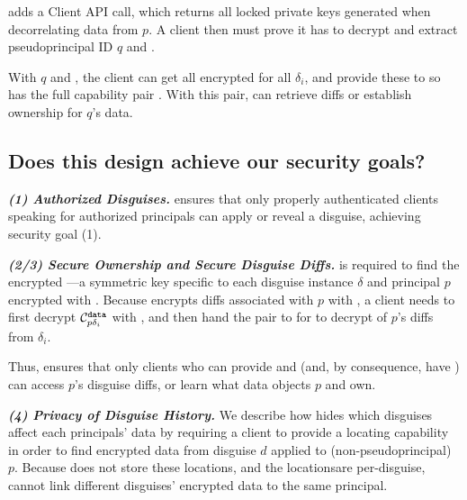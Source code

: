 \sys adds a  Client API call, which returns all locked private
keys  generated when decorrelating data from $p$.
A client then must prove it has  to decrypt  and extract pseudoprincipal ID $q$ and .

With $q$ and , the client can get all encrypted  for all $\delta_i$, and
provide these to \sys so \sys has the full capability pair . With
this pair, \sys can retrieve diffs or establish ownership for $q$'s data.


\subsection{Does this design achieve our security goals?}
\label{sec:achievegoals}
\vspace{6pt}\noindent\textbf{\emph{(1) Authorized Disguises.}}
\sys ensures that only properly authenticated clients speaking for authorized principals can apply or
reveal a disguise, achieving security goal (1).

\vspace{6pt}\noindent\textbf{\emph{(2/3) Secure Ownership and Secure Disguise Diffs.}}
 is required to find the encrypted ---a symmetric key
specific to each disguise instance $\delta$ and principal $p$ encrypted with .
Because \sys encrypts  diffs associated with $p$ with , a client
needs to first decrypt $\mathcal{C}^{\texttt{data}}_{p\delta_i}$ with , and then hand the pair 
to \sys for \sys to decrypt of $p$'s diffs from $\delta_i$.

Thus, \sys ensures that only clients who can provide  and  (and,
by consequence, have ) can access $p$'s disguise diffs, or learn what data objects $p$ and
own. 

\vspace{6pt}\noindent\textbf{\emph{(4) Privacy of Disguise History.}}
We describe how \sys hides which disguises affect each principals' data by requiring a client to
provide a locating capability  in order to find encrypted data from disguise $d$ applied
to (non-pseudoprincipal) $p$. Because \sys does not store these locations, and the locationsare per-disguise, \sys
cannot link different disguises' encrypted data to the same principal.

